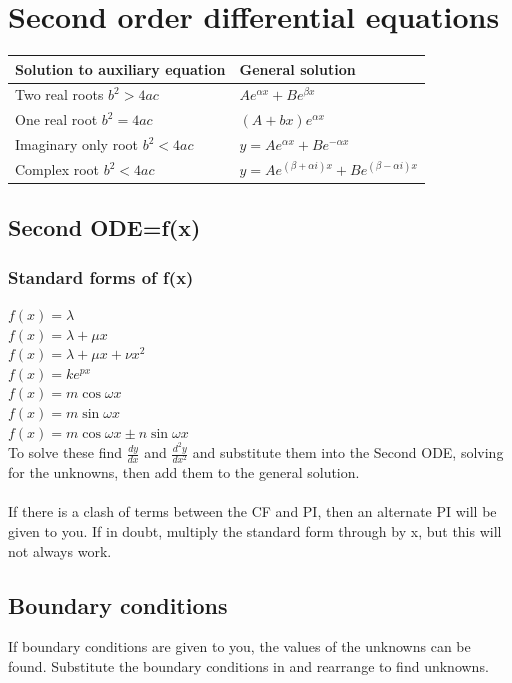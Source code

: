 \documentclass{article}[18pt]
\begin{document}
\section{Second order differential equations}
{\renewcommand{\arraystretch}{2}
\begin{tabularx}{\textwidth}{|X|X|}
\hline
\textbf{Solution to auxiliary equation}&\textbf{General solution}\\
\hline
Two real roots $b^2>4ac$&$Ae^{\alpha x}+Be^{\beta x}$\\
\hline
One real root $b^2=4ac$&$(A+bx)e^{\alpha x}$\\
\hline
Imaginary only root $b^2<4ac$&$y=Ae^{\alpha x}+Be^{-\alpha x}$\\
\hline
Complex root $b^2<4ac$&$y=Ae^{(\beta+\alpha i)x}+Be^{(\beta-\alpha i)x}$\\
\hline
\end{tabularx}}
\subsection{Second ODE=f(x)}
\subsubsection{Standard forms of f(x)}
$f(x)=\lambda$\\
$f(x)=\lambda+\mu x$\\
$f(x)=\lambda+\mu x+\nu x^2$\\
$f(x)=ke^{px}$\\
$f(x)=m\cos\omega x$\\
$f(x)=m\sin\omega x$\\
$f(x)=m\cos\omega x\pm n\sin\omega x$
\\
To solve these find $\frac{dy}{dx}$ and $\frac{d^2y}{dx^2}$ and substitute them into the Second ODE, solving for the unknowns, then add them to the general solution.\\
\\
If there is a clash of terms between the CF and PI, then an alternate PI will be given to you. If in doubt, multiply the standard form through by x, but this will not always work.
\subsection{Boundary conditions}
If boundary conditions are given to you, the values of the unknowns can be found. Substitute the boundary conditions in and rearrange to find unknowns.
\newpage
\end{document}
